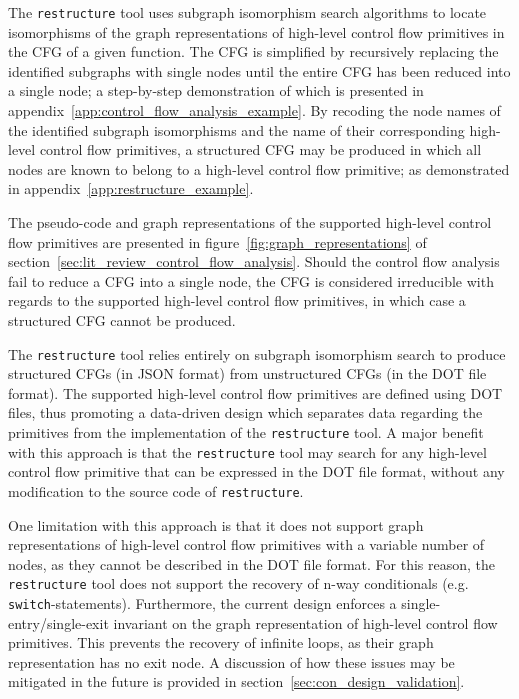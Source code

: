 The \texttt{restructure} tool uses subgraph isomorphism search algorithms to locate isomorphisms of the graph representations of high-level control flow primitives in the CFG of a given function. The CFG is simplified by recursively replacing the identified subgraphs with single nodes until the entire CFG has been reduced into a single node; a step-by-step demonstration of which is presented in appendix~\ref{app:control_flow_analysis_example}. By recoding the node names of the identified subgraph isomorphisms and the name of their corresponding high-level control flow primitives, a structured CFG may be produced in which all nodes are known to belong to a high-level control flow primitive; as demonstrated in appendix~\ref{app:restructure_example}.

The pseudo-code and graph representations of the supported high-level control flow primitives are presented in figure~\ref{fig:graph_representations} of section~\ref{sec:lit_review_control_flow_analysis}. Should the control flow analysis fail to reduce a CFG into a single node, the CFG is considered irreducible with regards to the supported high-level control flow primitives, in which case a structured CFG cannot be produced.

The \texttt{restructure} tool relies entirely on subgraph isomorphism search to produce structured CFGs (in JSON format) from unstructured CFGs (in the DOT file format). The supported high-level control flow primitives are defined using DOT files, thus promoting a data-driven design which separates data regarding the primitives from the implementation of the \texttt{restructure} tool. A major benefit with this approach is that the \texttt{restructure} tool may search for any high-level control flow primitive that can be expressed in the DOT file format, without any modification to the source code of \texttt{restructure}.

One limitation with this approach is that it does not support graph representations of high-level control flow primitives with a variable number of nodes, as they cannot be described in the DOT file format. For this reason, the \texttt{restructure} tool does not support the recovery of n-way conditionals (e.g. \texttt{switch}-statements). Furthermore, the current design enforces a single-entry/single-exit invariant on the graph representation of high-level control flow primitives. This prevents the recovery of infinite loops, as their graph representation has no exit node. A discussion of how these issues may be mitigated in the future is provided in section~\ref{sec:con_design_validation}.
